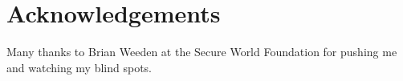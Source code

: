 \section*{Acknowledgements}

Many thanks to Brian Weeden at the Secure World Foundation for pushing
me and watching my blind spots.
